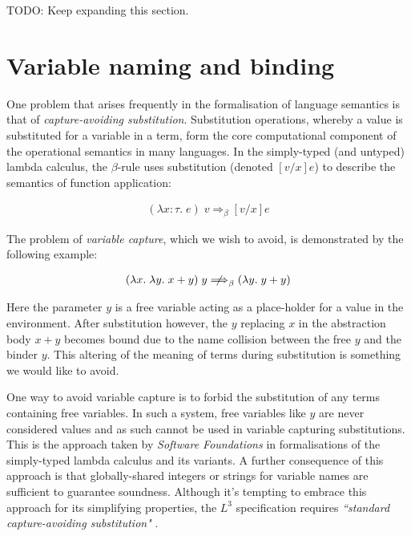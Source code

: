 \documentclass[]{unswthesis}
\let\i\textit
\begin{document}
TODO: Keep expanding this section.

\section{Variable naming and binding}
\label{sec:var_naming}

One problem that arises frequently in the formalisation of language semantics is that of \i{capture-avoiding substitution}. Substitution operations, whereby a value is substituted for a variable in a term, form the core computational component of the operational semantics in many languages. In the simply-typed (and untyped) lambda calculus, the $\beta$-rule uses substitution (denoted $[v/x]e$) to describe the semantics of function application:

\begin{eqnarray*}
(\lambda x : \tau. \; e) \; v \Longrightarrow_\beta [v/x]e
\end{eqnarray*}

The problem of \i{variable capture}, which we wish to avoid, is demonstrated by the following example:

\begin{eqnarray*}
(\lambda x. \; \lambda y. \; x + y) \; y \; {\centernot\Longrightarrow}_\beta \; (\lambda y. \; y + y)
\end{eqnarray*}

Here the parameter $y$ is a free variable acting as a place-holder for a value in the environment. After substitution however, the $y$ replacing $x$ in the abstraction body $x + y$ becomes bound due to the name collision between the free $y$ and the binder $y$. This altering of the meaning of terms during substitution is something we would like to avoid.

One way to avoid variable capture is to forbid the substitution of any terms containing free variables. In such a system, free variables like $y$ are never considered values and as such cannot be used in variable capturing substitutions. This is the approach taken by \i{Software Foundations} \cite{pierce15} in formalisations of the simply-typed lambda calculus and its variants. A further consequence of this approach is that globally-shared integers or strings for variable names are sufficient to guarantee soundness. Although it's tempting to embrace this approach for its simplifying properties, the $L^3$ specification requires \i{``standard capture-avoiding substitution"} \cite{ahmed05}.

\end{document}
